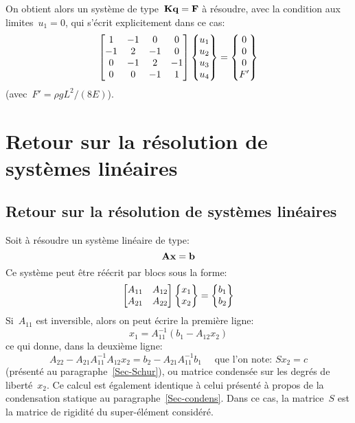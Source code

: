 %
On obtient alors un système de type~$\MM{K}\VV{q}=\VV{F}$ à résoudre, avec la condition aux limites~$u_1=0$, qui s'écrit explicitement dans ce cas:
\begin{equation}
\MM*{1 & -1 & 0 & 0 \\ -1 & 2 & -1 & 0 \\ 0 & -1 & 2 & -1\\ 0&0&-1&1}
\VV*{u_1\\u_2\\u_3\\u_4}
=
\VV*{0\\0\\0\\F'}
\end{equation}
(avec~$F'=\rho g L^2/(8E)$).

\medskipvm
\ifVersionAvecExemplesSepares
  \section{Retour sur la résolution de systèmes linéaires}
\else
  \subsection{Retour sur la résolution de systèmes linéaires}
\fi
Soit à résoudre un système linéaire de type:
\begin{equation}\label{Eq-lin} \MM{A}\VV{x}=\VV{b} \end{equation}
Ce système peut être réécrit par blocs sous la forme:
\begin{equation} 
\MM*{A_{11} & A_{12}\\ A_{21} & A_{22}}
\VV*{x_1 \\ x_2} =
\VV*{b_1\\ b_2}
\end{equation}
\medskipvm
Si~$A_{11}$ est inversible, alors on peut écrire la première ligne:
\begin{equation}
x_1 = A_{11}^{-1}\left( b_1-A_{12}x_2 \right)
\end{equation}
ce qui donne, dans la deuxième ligne:
\begin{equation}
A_{22} - A_{21}A_{11}^{-1}A_{12}x_2 = b_2 - A_{21}A_{11}^{-1}b_1
\quad \text{ que l'on note: }
S x_2=c
\end{equation}
(présenté au paragraphe~\ref{Sec-Schur}), ou matrice condensée sur les degrés de liberté~$x_2$.
Ce calcul est également identique à celui présenté à propos de la condensation statique au paragraphe~\ref{Sec-condens}.
Dans ce cas, la matrice~$S$ est la matrice de rigidité du super-élément considéré.

